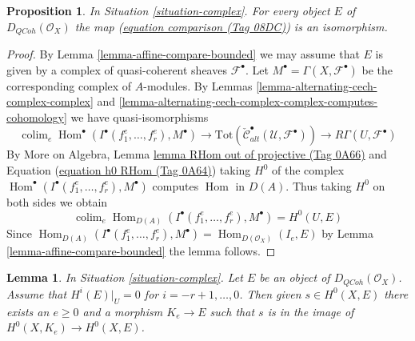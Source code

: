 \documentclass{amsart}
\theoremstyle{plain}
\newtheorem{proposition}[subsection]{Proposition}
\newtheorem{lemma}[subsection]{Lemma}
\theoremstyle{definition}
\theoremstyle{remark}
\numberwithin{equation}{subsection}
\def\colim{\mathop{\mathrm{colim}}\nolimits}
\def\Hom{\mathop{\mathrm{Hom}}\nolimits}
\def\QCoh{\mathit{QCoh}}
\begin{document}
\begin{proposition}
\label{proposition-represent-cohomology-class-on-open}
In Situation \ref{situation-complex}. For every object $E$
of $D_\QCoh(\mathcal{O}_X)$ the map
(\href{https://stacks.math.columbia.edu/tag/08DC}{equation comparison (Tag 08DC)}) is an isomorphism.
\end{proposition}

\begin{proof}
By Lemma \ref{lemma-affine-compare-bounded} we may assume that $E$
is given by a complex of quasi-coherent sheaves $\mathcal{F}^\bullet$.
Let $M^\bullet = \Gamma(X, \mathcal{F}^\bullet)$ be the corresponding
complex of $A$-modules. By
Lemmas \ref{lemma-alternating-cech-complex-complex} and
\ref{lemma-alternating-cech-complex-complex-computes-cohomology}
we have quasi-isomorphisms
$$
\colim_e \Hom^\bullet(I^\bullet(f_1^e, \ldots, f_r^e), M^\bullet)
\longrightarrow
\text{Tot}(\check{\mathcal{C}}_{alt}^\bullet(\mathcal{U}, \mathcal{F}^\bullet))
\longrightarrow
R\Gamma(U, \mathcal{F}^\bullet)
$$
By More on Algebra, Lemma \href{https://stacks.math.columbia.edu/tag/0A66}{lemma RHom out of projective (Tag 0A66)} and
Equation (\href{https://stacks.math.columbia.edu/tag/0A64}{equation h0 RHom (Tag 0A64)})
taking $H^0$ of the complex
$\Hom^\bullet(I^\bullet(f_1^e, \ldots, f_r^e), M^\bullet)$
computes $\Hom$ in $D(A)$. Thus taking $H^0$ on both sides we obtain
$$
\colim_e \Hom_{D(A)}(I^\bullet(f_1^e, \ldots, f_r^e), M^\bullet)
=
H^0(U, E)
$$
Since $\Hom_{D(A)}(I^\bullet(f_1^e, \ldots, f_r^e), M^\bullet) =
\Hom_{D(\mathcal{O}_X)}(I_e, E)$ by
Lemma \ref{lemma-affine-compare-bounded} the lemma follows.
\end{proof}


\begin{lemma}
\label{lemma-represent-cohomology-class-on-closed}
In Situation \ref{situation-complex}. Let $E$ be an object of
$D_\QCoh(\mathcal{O}_X)$.
Assume that $H^i(E)|_U = 0$ for $i = - r + 1, \ldots, 0$.
Then given $s \in H^0(X, E)$ there exists an $e \geq 0$ and
a morphism $K_e \to E$ such that $s$ is in the image of
$H^0(X, K_e) \to H^0(X, E)$.
\end{lemma}
\end{document}
